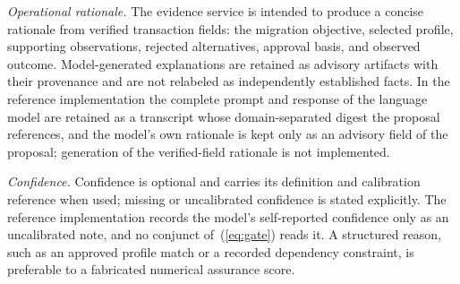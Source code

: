 \emph{Operational rationale.} The evidence service is intended to produce a concise rationale from verified transaction fields: the migration objective, selected profile, supporting observations, rejected alternatives, approval basis, and observed outcome. Model-generated explanations are retained as advisory artifacts with their provenance and are not relabeled as independently established facts. In the reference implementation the complete prompt and response of the language model are retained as a transcript whose domain-separated digest the proposal references, and the model's own rationale is kept only as an advisory field of the proposal; generation of the verified-field rationale is not implemented.

\emph{Confidence.} Confidence is optional and carries its definition and calibration reference when used; missing or uncalibrated confidence is stated explicitly. The reference implementation records the model's self-reported confidence only as an uncalibrated note, and no conjunct of~(\ref{eq:gate}) reads it. A structured reason, such as an approved profile match or a recorded dependency constraint, is preferable to a fabricated numerical assurance score.
